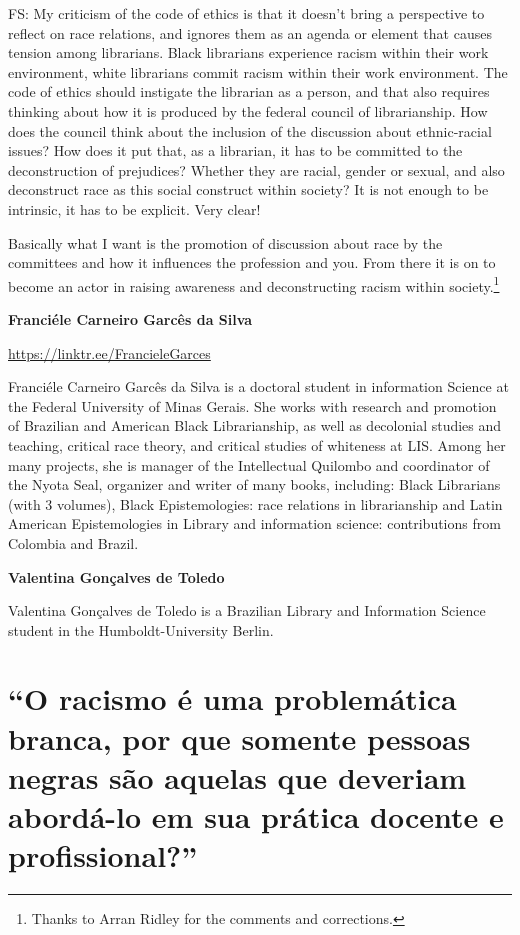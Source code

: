 \documentclass[a4paper,
fontsize=11pt,
oneside,
numbers=noperiodatend,
parskip=half-,
bibliography=totoc,
final
]{scrartcl}
\begin{document}
FS: My criticism of the code of ethics is that it doesn't bring a
perspective to reflect on race relations, and ignores them as an agenda
or element that causes tension among librarians. Black librarians
experience racism within their work environment, white librarians commit
racism within their work environment. The code of ethics should
instigate the librarian as a person, and that also requires thinking
about how it is produced by the federal council of librarianship. How
does the council think about the inclusion of the discussion about
ethnic-racial issues? How does it put that, as a librarian, it has to be
committed to the deconstruction of prejudices? Whether they are racial,
gender or sexual, and also deconstruct race as this social construct
within society? It is not enough to be intrinsic, it has to be explicit.
Very clear!

Basically what I want is the promotion of discussion about race by the
committees and how it influences the profession and you. From there it
is on to become an actor in raising awareness and deconstructing racism
within society.\footnote{Thanks to Arran Ridley for the comments and
  corrections.}

\textbf{Franciéle Carneiro Garcês da Silva}

\url{https://linktr.ee/FrancieleGarces}

Franciéle Carneiro Garcês da Silva is a doctoral student in information
Science at the Federal University of Minas Gerais. She works with
research and promotion of Brazilian and American Black Librarianship, as
well as decolonial studies and teaching, critical race theory, and
critical studies of whiteness at LIS. Among her many projects, she is
manager of the Intellectual Quilombo and coordinator of the Nyota Seal,
organizer and writer of many books, including: Black Librarians (with 3
volumes), Black Epistemologies: race relations in librarianship and
Latin American Epistemologies in Library and information science:
contributions from Colombia and Brazil.

\textbf{Valentina Gonçalves de Toledo}

Valentina Gonçalves de Toledo is a Brazilian Library and Information
Science student in the Humboldt-University Berlin.

\pagebreak

\hypertarget{o-racismo-uxe9-uma-problemuxe1tica-branca-por-que-somente-pessoas-negras-suxe3o-aquelas-que-deveriam-aborduxe1-lo-em-sua-pruxe1tica-docente-e-profissional}{%
\section{\texorpdfstring{\enquote{O racismo é uma problemática
branca, por que somente pessoas negras são aquelas que deveriam
abordá-lo em sua prática docente e
profissional?}}{``O racismo é uma problemática branca, por que somente pessoas negras são aquelas que deveriam abordá-lo em sua prática docente e profissional?''}}\label{o-racismo-uxe9-uma-problemuxe1tica-branca-por-que-somente-pessoas-negras-suxe3o-aquelas-que-deveriam-aborduxe1-lo-em-sua-pruxe1tica-docente-e-profissional}}
\end{document}
